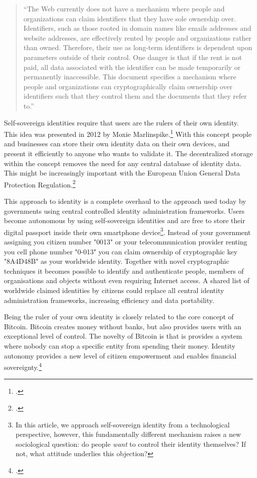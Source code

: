 \documentclass[USenglish]{article}
\begin{document}
\blockquote{\enquote{The Web currently does not have a mechanism where people and organizations can claim identifiers that they have sole ownership over. Identifiers, such as those rooted in domain names like emails addresses and website addresses, are effectively rented by people and organizations rather than owned. Therefore, their use as long-term identifiers is dependent upon parameters outside of their control. One danger is that if the rent is not paid, all data associated with the identifier can be made temporarily or permanently inaccessible. This document specifies a mechanism where people and organizations can cryptographically claim ownership over identifiers such that they control them and the documents that they refer to.}}

Self-sovereign identities require that users are the rulers of their own identity.
This idea was presented in 2012 by Moxie Marlinspike.\footcite{sovereignsource}
With this concept people and businesses can store their own identity data on their own devices, and present it efficiently to anyone who wants to validate it.
The decentralized storage within the concept removes the need for any central database of identity data.
This might be increasingly important with the European Union General Data Protection Regulation.\footcite{dataportabilityeu}

This approach to identity is a complete overhaul to the approach used today by governments using central controlled identity administration frameworks.
Users become autonomous by using self-sovereign identities and are free to store their digital passport inside their own smartphone device\footnote{In this article, we approach self-sovereign identity from a technological perspective, however, this fundamentally different mechanism raises a new sociological question: do people \emph{want} to control their identity themselves? If not, what attitude underlies this objection?}.
Instead of your government assigning you citizen number "0013" or your telecommunication provider renting you cell phone number "0-013" you can claim ownership of cryptographic key "8A4D48B" as your worldwide identity.
Together with novel cryptographic techniques it becomes possible to identify and authenticate people, members of organisations and objects without even requiring Internet access.
A shared list of worldwide claimed identities by citizens could replace all central identity administration frameworks, increasing efficiency and data portability.

Being the ruler of your own identity is closely related to the core concept of Bitcoin.
Bitcoin creates money without banks, but also provides users with an exceptional level of control.
The novelty of Bitcoin is that is provides a system where nobody can stop a specific entity from spending their money.
Identity autonomy provides a new level of citizen empowerment and enables financial sovereignty.\footcite{matouk2009financial}
\end{document}
